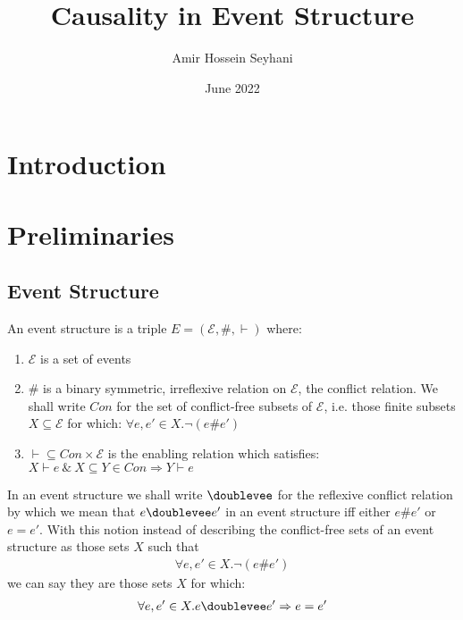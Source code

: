 \documentclass{article}
\title{Causality in Event Structure}
\author{Amir Hossein Seyhani}
\date{June 2022}
\begin{document}
\maketitle

\tableofcontents
\pagebreak

\section{Introduction}

\section{Preliminaries}
\subsection{Event Structure}
\begin{definition}
    An event structure is a triple $E = (\mathcal{E},\#,\vdash)$ where:
    \begin{enumerate}
        \item $\mathcal{E}$ is a set of events
        \item \# is a binary symmetric, irreflexive relation on $\mathcal{E}$,
              the conflict relation.
              We shall write $Con$ for the set of conflict-free subsets of $\mathcal{E}$,
              i.e. those finite subsets $X \subseteq \mathcal{E}$ for which:
              $\forall e,e' \in X . \neg (e\#e')$
        \item $\vdash \subseteq Con \times \mathcal{E}$ is the enabling relation which satisfies:
              $ X \vdash e \ \& \ X \subseteq Y \in Con \Rightarrow Y \vdash e$
    \end{enumerate}

\end{definition}
\begin{notion}
    In an event structure we shall write $\doublevee$ for the reflexive conflict relation by which we mean
    that $e\doublevee e'$ in an event structure iff either $e\#e'$ or $e=e'$.
    With this notion instead of describing the conflict-free sets of an event structure
    as those sets $X$ such that
    \begin{align*}
        \forall e,e' \in X. \neg(e\#e')
    \end{align*}
    we can say they are those sets $X$ for which:
    \begin{align*}
        \forall e,e' \in X. e\doublevee e' \Rightarrow e=e'
    \end{align*}
\end{notion}
\end{document}
